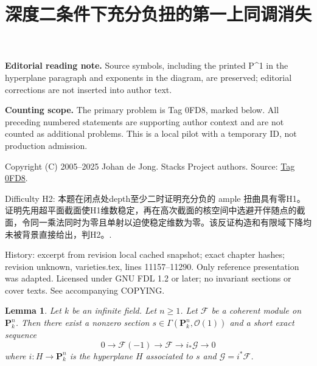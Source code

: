 \documentclass{amsart}
\theoremstyle{plain}
\newtheorem{lemma}[subsection]{Lemma}
\theoremstyle{definition}
\theoremstyle{remark}
\numberwithin{equation}{subsection}
\begin{document}
\title[Stacks Project, Tag 0FD8]{深度二条件下充分负扭的第一上同调消失}
\maketitle
\noindent\textbf{Editorial reading note.} Source symbols, including the printed P\textasciicircum{}1 in the hyperplane paragraph and exponents in the diagram, are preserved; editorial corrections are not inserted into author text.


\noindent\textbf{Counting scope.} The primary problem is Tag 0FD8, marked below. All preceding numbered statements are supporting author context and are not counted as additional problems. This is a local pilot with a temporary ID, not production admission.


\noindent Copyright (C) 2005--2025 Johan de Jong. Stacks Project authors. Source: \href{https://stacks.math.columbia.edu/tag/0FD8}{Tag 0FD8}.

\noindent Difficulty H2: 本题在闭点处depth至少二时证明充分负的 ample 扭曲具有零H1。证明先用超平面截面使H1维数稳定，再在高次截面的核空间中选避开伴随点的截面，令同一乘法同时为零且单射以迫使稳定维数为零。该反证构造和有限域下降均未被背景直接给出，判H2。.

\noindent History: excerpt from revision local cached snapshot; exact chapter hashes; revision unknown, varieties.tex, lines 11157--11290. Only reference presentation was adapted. Licensed under GNU FDL 1.2 or later; no invariant sections or cover texts. See accompanying COPYING.

\begin{lemma}
\label{lemma-exact-sequence-induction}
Let $k$ be an infinite field. Let $n \geq 1$.
Let $\mathcal{F}$ be a coherent module on $\mathbf{P}^n_k$.
Then there exist a nonzero section
$s \in \Gamma(\mathbf{P}^n_k, \mathcal{O}(1))$
and a short exact sequence
$$
0 \to \mathcal{F}(-1) \to \mathcal{F} \to i_*\mathcal{G} \to 0
$$
where $i : H \to \mathbf{P}^n_k$ is the hyperplane $H$ associated to $s$
and $\mathcal{G} = i^*\mathcal{F}$.
\end{lemma}
\end{document}
